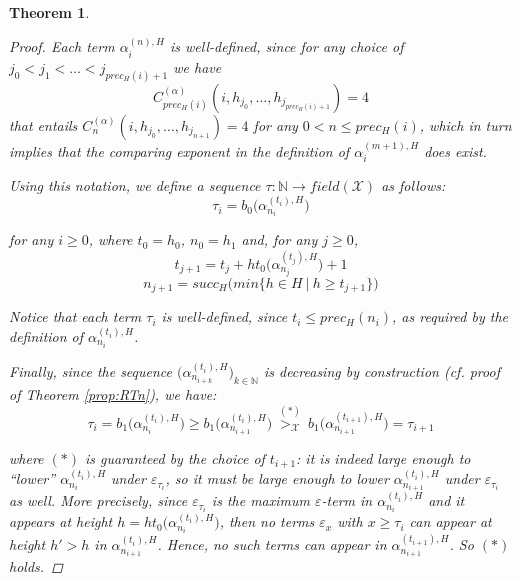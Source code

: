 \documentclass{amsart}
\newcommand\Nat{\mathbb{N}}
\newcommand{\LoX}{\mathcal{X}}
\newtheorem{theorem}{Theorem}
\begin{document}
\begin{theorem}
\begin{proof}
Each term $\alpha_i^{(n),H}$ is well-defined, since for any choice of $j_0 < j_1 < \ldots < j_{prec_H(i)+1}$ we have $$C_{prec_H(i)}^{(\alpha)}(i, h_{j_0}, \ldots, h_{j_{prec_H(i)+1}})\!=\!4$$ that entails $C_n^{(\alpha)}(i, h_{j_0}, \ldots, h_{j_{n+1}})\!=\!4$ for any $0 < n \leq prec_H(i)$, which in turn implies that the comparing exponent in the definition of $\alpha_i^{(m+1),H}$ does exist.

\medskip






Using this notation, we define a sequence $\tau : \Nat \rightarrow field(\LoX)$ as follows:
\begin{equation*}
    \tau_i = b_0\big(\alpha_{n_i}^{(t_i),H}\big)
\end{equation*}

for any $i \geq 0$, where $t_0=h_0$, $n_0=h_1$ and, for any $j \geq 0$,
\begin{equation*}
    t_{j+1} = t_j + ht_0\big(\alpha_{n_j}^{(t_j),H}\big) + 1
\end{equation*}
\begin{equation*}
    n_{j+1} = succ_H \big(min \big\{ h \in H \ \big|\ h \geq t_{j+1} \big\}\big)
\end{equation*}

\medskip

Notice that each term $\tau_i$ is well-defined, since $t_i \leq prec_H(n_i)$, as required by the definition of $\alpha_{n_i}^{(t_i),H}$.

Finally, since the sequence $\big(\alpha_{n_{i+k}}^{(t_i),H}\big)_{k \in \Nat}$ is decreasing by construction (cf. proof of Theorem \ref{prop:RTn}), we have:
\begin{equation*}
\tau_i = b_1\big(\alpha_{n_i}^{(t_i),H}\big) \geq b_1\big(\alpha_{n_{i+1}}^{(t_i),H}\big) \ \overset{(*)}{>_\LoX}\ b_1\big(\alpha_{n_{i+1}}^{(t_{i+1}),H}\big) = \tau_{i+1}
\end{equation*}

where $(*)$ is guaranteed by the choice of $t_{i+1}$: it is indeed large enough to ``lower'' $\alpha_{n_i}^{(t_i),H}$ under $\varepsilon_{\tau_i}$, so it must be large enough to lower $\alpha_{n_{i+1}}^{(t_i),H}$ under $\varepsilon_{\tau_i}$ as well. More precisely, since $\varepsilon_{\tau_i}$ is the maximum $\varepsilon$-term in $\alpha_{n_i}^{(t_i),H}$ and it appears at height $h = ht_0\big(\alpha_{n_i}^{(t_i),H}\big)$, then no terms $\varepsilon_x$ with $x \geq \tau_i$ can appear at height $h'>h$ in $\alpha_{n_{i+1}}^{(t_i),H}$. Hence, no such terms can appear in $\alpha_{n_{i+1}}^{(t_{i+1}),H}$. So $(*)$ holds.


\end{proof}
\end{theorem}
\end{document}
